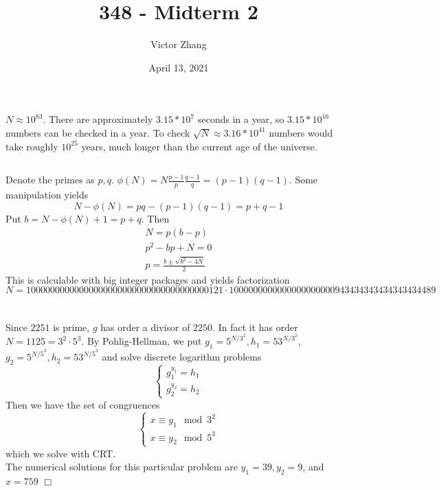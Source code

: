 \documentclass{article}
\title{348 - Midterm 2}
\author{Victor Zhang}
\date{April 13, 2021}
\begin{document}
\maketitle

\section{}
\subsection{}
$N \approx 10^{83}$. There are approximately $3.15*10^7$ seconds in a year, so $3.15*10^{16}$ numbers can be checked in a year. To check $\sqrt{N} \approx 3.16*10^{41}$ numbers would take roughly $10^{25}$ years, much longer than the current age of the universe.
\subsection{}
Denote the primes as $p,q$. $\phi(N) = N \frac{p-1}{p} \frac{q-1}{q} = (p-1)(q-1)$. Some manipulation yields
$$N - \phi(N) = pq - (p-1)(q-1) = p + q - 1$$
Put $b = N - \phi(N) + 1 = p + q$. Then
\begin{gather*}
N = p(b-p)\\
p^2 - bp + N = 0\\
p = \frac{b \pm \sqrt{b^2-4N}}{2}
\end{gather*}
This is calculable with big integer packages and yields factorization
$$N = 10000000000000000000000000000000000000121 \cdot 1000000000000000000000943434343434343434489$$

\section{}
Since $2251$ is prime, $g$ has order a divisor of $2250$. In fact it has order $N = 1125 = 3^2 \cdot 5^3$. By Pohlig-Hellman, we put $g_1 = 5^{N/3^2}, h_1 = 53^{N/3^2}$, $g_2 = 5^{N/5^3}, h_2 = 53^{N/5^3}$ and solve discrete logarithm problems
\begin{equation*}
\begin{cases}
g_1^{y_1} = h_1\\
g_2^{y_2} = h_2
\end{cases}
\end{equation*}
Then we have the set of congruences
\begin{equation*}
\begin{cases}
x \equiv y_1 \!\!\!\mod 3^2\\
x \equiv y_2 \!\!\!\mod 5^3
\end{cases}
\end{equation*}
which we solve with CRT.\\
The numerical solutions for this particular problem are $y_1 = 39, y_2 = 9$, and $x = 759$ $\Box$
\end{document}
